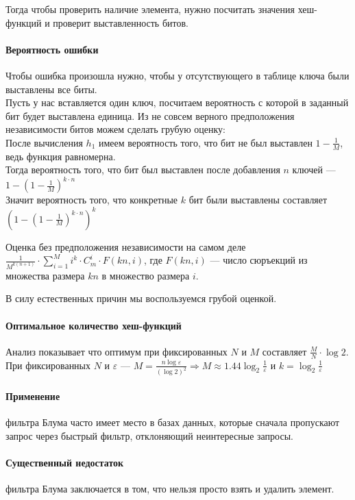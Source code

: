 Тогда чтобы проверить наличие элемента, нужно посчитать значения хеш-функций и проверит выставленность битов.

\paragraph{Вероятность ошибки}
Чтобы ошибка произошла нужно, чтобы у отсутствующего в таблице ключа были выставлены все биты. \\
Пусть у нас вставляется один ключ, посчитаем вероятность с которой в заданный бит будет выставлена единица.
Из не совсем верного предположения независимости битов можем сделать грубую оценку: \\
После вычисления $h_1$ имеем вероятность того, что бит не был выставлен  $ 1 - \frac{1}{M}$, ведь функция равномерна. \\
Тогда вероятность того, что бит был выставлен после добавления $n$ ключей ---  $1 - \left (1 - \frac{1}{M} \right) ^{k \cdot n}$ \\
Значит вероятность того, что конкретные $k$ бит были выставлены составляет  $\left( 1 - \left(1 - \frac{1}{M}\right) ^{k \cdot n}\right) ^k$

Оценка без предположения независимости на самом деле $\frac{1}{M^{k(n + 1)}} \cdot \sum \limits _{i = 1}^{M} i^k \cdot C_m ^ i \cdot F(kn, i)$, 
где $F(kn, i)$ --- число сюръекций из множества размера $kn$ в множество размера  $i$.

В силу естественных причин мы воспользуемся грубой оценкой.

\paragraph{Оптимальное количество хеш-функций}
Анализ показывает что оптимум при фиксированных $N$ и  $M$ составляет  $\frac{M}{N} \cdot \log{2}$. \\
При фиксированных $N$ и  $\varepsilon$ --- $M = \frac{n \log{\varepsilon}}{(\log{2})^2} \Rightarrow M \approx 1.44 \log_2{\frac{1}{\varepsilon}}$ и $k = \log_2{\frac{1}{\varepsilon}}$

\paragraph{Применение} фильтра Блума часто имеет место в базах данных, которые сначала пропускают запрос через быстрый фильтр, отклоняющий неинтересные запросы.

\paragraph{Существенный недостаток} фильтра Блума заключается в том, что нельзя просто взять и удалить элемент.

